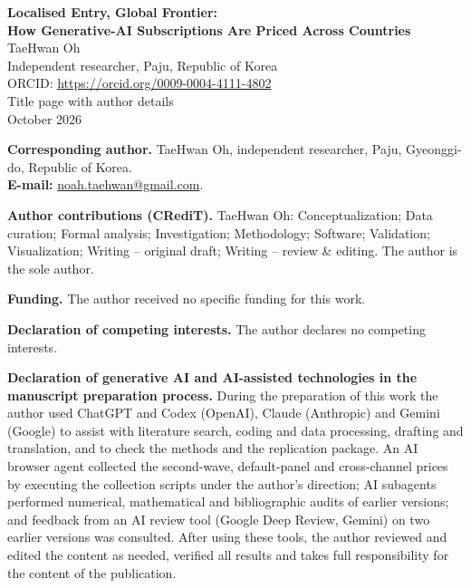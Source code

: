 \documentclass[11pt]{article}
\begin{document}
\begin{center}
{\LARGE\bfseries Localised Entry, Global Frontier:\\[2pt] How Generative-AI Subscriptions Are Priced Across Countries}\\[14pt]
{\large TaeHwan Oh}\\[4pt]
Independent researcher, Paju, Republic of Korea\\
ORCID: \href{https://orcid.org/0009-0004-4111-4802}{https://orcid.org/0009-0004-4111-4802}\\[10pt]
Title page with author details \\ October 2026
\end{center}

\textbf{Corresponding author.} TaeHwan Oh, independent researcher, Paju, Gyeonggi-do, Republic of Korea.\\
\textbf{E-mail:} \href{mailto:noah.taehwan@gmail.com}{noah.taehwan@gmail.com}.

\textbf{Author contributions (CRediT).} TaeHwan Oh: Conceptualization; Data curation; Formal analysis; Investigation; Methodology; Software; Validation; Visualization; Writing -- original draft; Writing -- review \& editing. The author is the sole author.

\textbf{Funding.} The author received no specific funding for this work.

\textbf{Declaration of competing interests.} The author declares no competing interests.

\textbf{Declaration of generative AI and AI-assisted technologies in the manuscript preparation process.} During the preparation of this work the author used ChatGPT and Codex (OpenAI), Claude (Anthropic) and Gemini (Google) to assist with literature search, coding and data processing, drafting and translation, and to check the methods and the replication package. An AI browser agent collected the second-wave, default-panel and cross-channel prices by executing the collection scripts under the author's direction; AI subagents performed numerical, mathematical and bibliographic audits of earlier versions; and feedback from an AI review tool (Google Deep Review, Gemini) on two earlier versions was consulted. After using these tools, the author reviewed and edited the content as needed, verified all results and takes full responsibility for the content of the publication.
\end{document}
